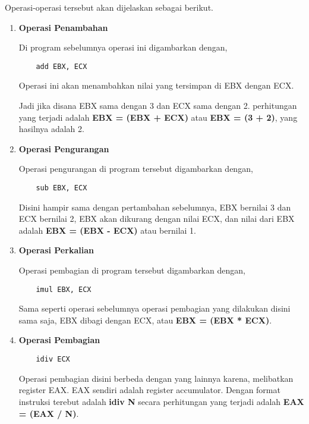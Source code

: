 Operasi-operasi tersebut akan dijelaskan sebagai berikut.

\begin{enumerate}

  \item \textbf{Operasi Penambahan}

    Di program sebelumnya operasi ini digambarkan dengan,

    \begin{lstlisting}
    add EBX, ECX
    \end{lstlisting}

    Operasi ini akan menambahkan nilai yang tersimpan di EBX dengan ECX.

    Jadi jika disana EBX sama dengan 3 dan ECX sama dengan 2. perhitungan
    yang terjadi adalah \textbf{EBX = (EBX + ECX)} atau \textbf{EBX = (3 + 2)},
    yang hasilnya adalah 2.

  \item \textbf{Operasi Pengurangan}

    Operasi pengurangan di program tersebut digambarkan dengan,

    \begin{lstlisting}
    sub EBX, ECX
    \end{lstlisting}

    Disini hampir sama dengan pertambahan sebelumnya, EBX bernilai 3 dan ECX bernilai 2,
    EBX akan dikurang dengan nilai ECX, dan nilai dari EBX adalah \textbf{EBX = (EBX - ECX)}
    atau bernilai 1.

  \item \textbf{Operasi Perkalian}

    Operasi pembagian di program tersebut digambarkan dengan,

    \begin{lstlisting}
    imul EBX, ECX
    \end{lstlisting}

    Sama seperti operasi sebelumnya operasi pembagian yang dilakukan disini sama saja,
    EBX dibagi dengan ECX, atau \textbf{EBX = (EBX * ECX)}.

  \item \textbf{Operasi Pembagian}

    \begin{lstlisting}
    idiv ECX
    \end{lstlisting}

    Operasi pembagian disini berbeda dengan yang lainnya karena, melibatkan register
    EAX. EAX sendiri adalah register accumulator. Dengan format instruksi terebut
    adalah \textbf{idiv N} secara perhitungan yang terjadi adalah \textbf{EAX = (EAX / N)}.


\end{enumerate}
